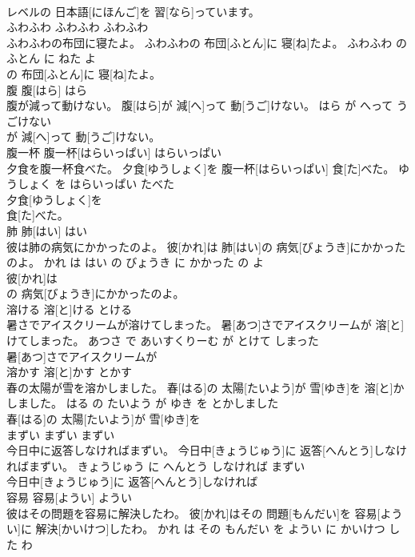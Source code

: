 \documentclass[8pt]{extreport}
\begin{document}
\begin{CJK}{UTF8}{min}
\\	レベルの 日本語[にほんご]を 習[なら]っています。			
\\	ふわふわ	ふわふわ	ふわふわ	
\\	ふわふわの布団に寝たよ。	ふわふわの 布団[ふとん]に 寝[ね]たよ。	ふわふわ の ふとん に ねた よ	
\\	の 布団[ふとん]に 寝[ね]たよ。			
\\	腹	腹[はら]	はら	
\\	腹が減って動けない。	腹[はら]が 減[へ]って 動[うご]けない。	はら が へって うごけない	
\\	が 減[へ]って 動[うご]けない。			
\\	腹一杯	腹一杯[はらいっぱい]	はらいっぱい	
\\	夕食を腹一杯食べた。	夕食[ゆうしょく]を 腹一杯[はらいっぱい] 食[た]べた。	ゆうしょく を はらいっぱい たべた	
\\	夕食[ゆうしょく]を
\\	食[た]べた。			
\\	肺	肺[はい]	はい	
\\	彼は肺の病気にかかったのよ。	彼[かれ]は 肺[はい]の 病気[びょうき]にかかったのよ。	かれ は はい の びょうき に かかった の よ	
\\	彼[かれ]は
\\	の 病気[びょうき]にかかったのよ。			
\\	溶ける	溶[と]ける	とける	
\\	暑さでアイスクリームが溶けてしまった。	暑[あつ]さでアイスクリームが 溶[と]けてしまった。	あつさ で あいすくりーむ が とけて しまった	
\\	暑[あつ]さでアイスクリームが
\\	溶かす	溶[と]かす	とかす	
\\	春の太陽が雪を溶かしました。	春[はる]の 太陽[たいよう]が 雪[ゆき]を 溶[と]かしました。	はる の たいよう が ゆき を とかしました	
\\	春[はる]の 太陽[たいよう]が 雪[ゆき]を
\\	まずい	まずい	まずい	
\\	今日中に返答しなければまずい。	今日中[きょうじゅう]に 返答[へんとう]しなければまずい。	きょうじゅう に へんとう しなければ まずい	
\\	今日中[きょうじゅう]に 返答[へんとう]しなければ
\\	容易	容易[ようい]	ようい	
\\	彼はその問題を容易に解決したわ。	彼[かれ]はその 問題[もんだい]を 容易[ようい]に 解決[かいけつ]したわ。	かれ は その もんだい を ようい に かいけつ した わ	

\end{CJK}
\end{document}
